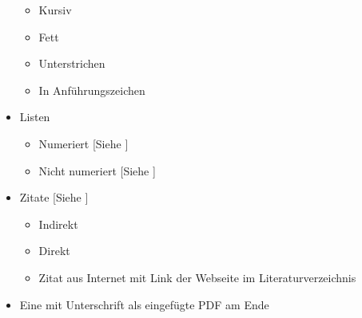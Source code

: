 \begin{itemize}
\begin{itemize}
            \item Kursiv
            \item Fett
            \item Unterstrichen
            \item In Anführungszeichen
        \end{itemize}
    \item Listen                
        \begin{itemize}
            \item Numeriert             [Siehe ]
            \item Nicht numeriert       [Siehe ]
        \end{itemize}
    \item Zitate                   [Siehe ]
        \begin{itemize}
            \item Indirekt
            \item Direkt 
            \item Zitat aus Internet mit Link der Webseite im Literaturverzeichnis
        \end{itemize}
    \item Eine  mit Unterschrift als eingefügte PDF am Ende
\end{itemize}